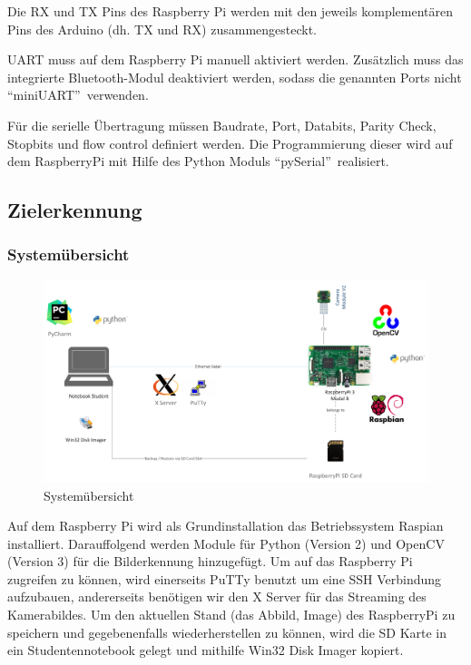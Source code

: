 \documentclass[a4paper]{report}
\begin{document}
Die RX und TX Pins des Raspberry Pi werden mit den jeweils komplementären Pins des Arduino (dh. TX und RX) zusammengesteckt.

UART muss auf dem Raspberry Pi manuell aktiviert werden.  Zusätzlich muss das integrierte Bluetooth-Modul deaktiviert werden, sodass die genannten Ports nicht \textquotedblleft miniUART\textquotedblright\ verwenden.

Für die serielle Übertragung müssen Baudrate, Port, Databits, Parity Check, Stopbits und flow control definiert werden. Die Programm\-ierung dieser wird auf dem RaspberryPi mit Hilfe des Python Moduls \textquotedblleft pySerial\textquotedblright\ realisiert.


\subsection{Zielerkennung}
\subsubsection{Systemübersicht}

\begin{figure}[h!]
	\includegraphics[keepaspectratio,width=\textwidth]{TargetRecOS}
	\caption{Systemübersicht}
	\label{fig:Systemuebersicht}
\end{figure}

Auf dem Raspberry Pi wird als Grundinstallation das Betriebssystem Raspian installiert. Darauffolgend werden Module für Python (Version 2) und OpenCV (Version 3) für die Bilderkennung hinzugefügt.
Um auf das Raspberry Pi zugreifen zu können, wird einerseits PuTTy benutzt um eine SSH Verbindung aufzubauen, andererseits benötigen wir den X Server für das Streaming des Kamerabildes.
Um den aktuellen Stand (das Abbild, Image) des RaspberryPi zu speichern und gegebenenfalls wiederherstellen zu können, wird die SD Karte in ein Studentennotebook gelegt und mithilfe Win32 Disk Imager kopiert.
\end{document}

